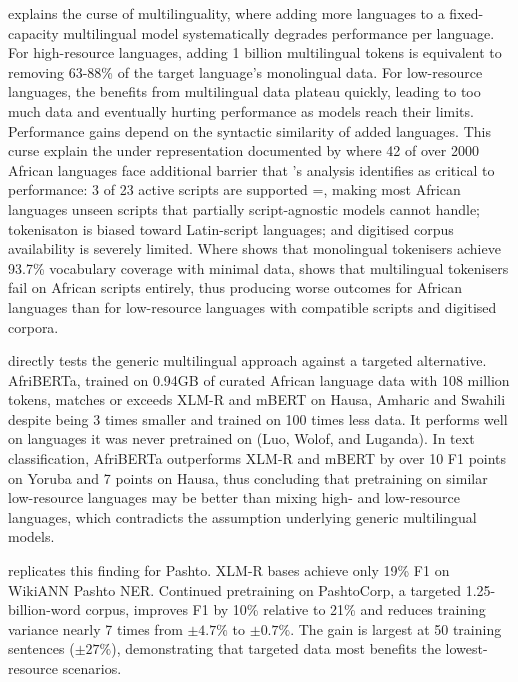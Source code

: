 \documentclass[11pt,a4paper]{article}
\begin{document}
\citet{chang2024multilinguality} explains the curse of multilinguality, where adding more languages to a fixed-capacity multilingual model systematically degrades performance per language. For high-resource languages, adding 1 billion multilingual tokens is equivalent to removing 63-88\% of the target language's monolingual data. For low-resource languages, the benefits from multilingual data plateau quickly, leading to too much data and eventually hurting performance as models reach their limits. Performance gains depend on the syntactic similarity of added languages. This curse explain the under representation documented by \citet{hussen2025state} where 42 of over 2000 African languages face additional barrier that \citet{chang2024multilinguality}'s analysis identifies as critical to performance: 3 of 23 active scripts are supported =, making most African languages unseen scripts that partially script-agnostic models cannot handle; tokenisaton is biased toward Latin-script languages; and digitised corpus availability is severely limited. Where \citet{chang2024multilinguality} shows that monolingual tokenisers achieve 93.7\% vocabulary coverage with minimal data, \citet{hussen2025state} shows that multilingual tokenisers fail on African scripts entirely, thus producing worse outcomes for African languages than for low-resource languages with compatible scripts and digitised corpora.

\citet{ogueji2022afriberta} directly tests the generic multilingual approach against a targeted alternative. AfriBERTa, trained on 0.94GB of curated African language data with 108 million tokens, matches or exceeds XLM-R and mBERT on Hausa, Amharic and Swahili despite being 3 times smaller and trained on 100 times less data. It performs well on languages it was never pretrained on (Luo, Wolof, and Luganda). In text classification, AfriBERTa outperforms XLM-R and mBERT by over 10 F1 points on Yoruba and 7 points on Hausa, thus concluding that pretraining on similar low-resource languages may be better than mixing high- and low-resource languages, which contradicts the assumption underlying generic multilingual models.

\citet{rahman2026pashtocorp} replicates this finding for Pashto. XLM-R bases achieve only 19\% F1 on WikiANN Pashto NER. Continued pretraining on PashtoCorp, a targeted 1.25-billion-word corpus, improves F1 by 10\% relative to 21\% and reduces training variance nearly 7 times from $\pm 4.7\%$ to $\pm 0.7\%$. The gain is largest at 50 training sentences ($\pm 27\%$), demonstrating that targeted data most benefits the lowest-resource scenarios.
\end{document}

